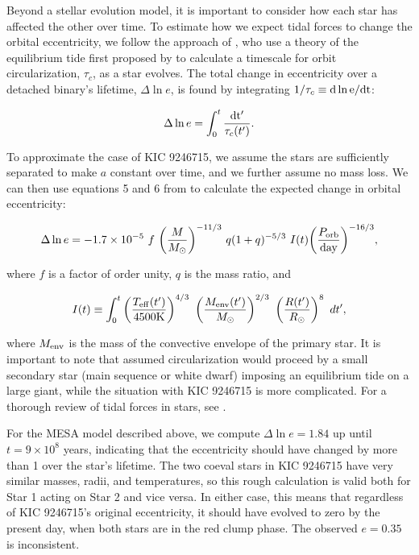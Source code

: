 Beyond a stellar evolution model, it is important to consider how each star has affected the other over time. To estimate how we expect tidal forces to change the orbital eccentricity, we follow the approach of \citet{ver95}, who use a theory of the equilibrium tide first proposed by \citet{zah77} to calculate a timescale for orbit circularization, $\tau_c$, as a star evolves. The total change in eccentricity over a detached binary's lifetime, $\Delta \ln e$, is found by integrating $1/\tau_c \equiv \rm{d} \ln e / \rm{d}t$:

\begin{equation}\label{circ}
\Delta \ln e = \int_0^t \frac{\rm{d}t'}{\tau_c(t')}.
\end{equation}

To approximate the case of KIC 9246715, we assume the stars are sufficiently separated to make $a$ constant over time, and we further assume no mass loss. We can then use equations 5 and 6 from \citet{ver95} to calculate the expected change in orbital eccentricity:

\begin{equation}\label{tide1}
\Delta \ln e = -1.7 \times 10^{-5} \ f \ {\left( \frac{M}{M_{\odot}} \right)}^{-11/3} \ q(1+q)^{-5/3} \ I(t) {\left( \frac{P_{\rm{orb}}}{\rm{day}} \right)}^{-16/3},
\end{equation}

where $f$ is a factor of order unity, $q$ is the mass ratio, and

\begin{equation}
I(t) \equiv \int_0^t \left( \frac{T_{\rm{eff}}(t')}{4500 \rm{K}} \right)^{4/3} \ \left( \frac{M_{\rm{env}}(t')}{M_{\odot}} \right)^{2/3} \ \left( \frac{R(t')}{R_{\odot}} \right)^8 \ dt',
\end{equation}

where $M_{\rm{env}}$ is the mass of the convective envelope of the primary star. It is important to note that \citet{ver95} assumed circularization would proceed by a small secondary star (main sequence or white dwarf) imposing an equilibrium tide on a large giant, while the situation with KIC 9246715 is more complicated. For a thorough review of tidal forces in stars, see \citet{ogi14}.

For the MESA model described above, we compute $\Delta \ln e = 1.84$ up until $t = 9 \times 10^8$ years, indicating that the eccentricity should have changed by more than 1 over the star's lifetime. The two coeval stars in KIC 9246715 have very similar masses, radii, and temperatures, so this rough calculation is valid both for Star 1 acting on Star 2 and vice versa. In either case, this means that regardless of KIC 9246715's original eccentricity, it should have evolved to zero by the present day, when both stars are in the red clump phase. The observed $e = 0.35$ is inconsistent.

